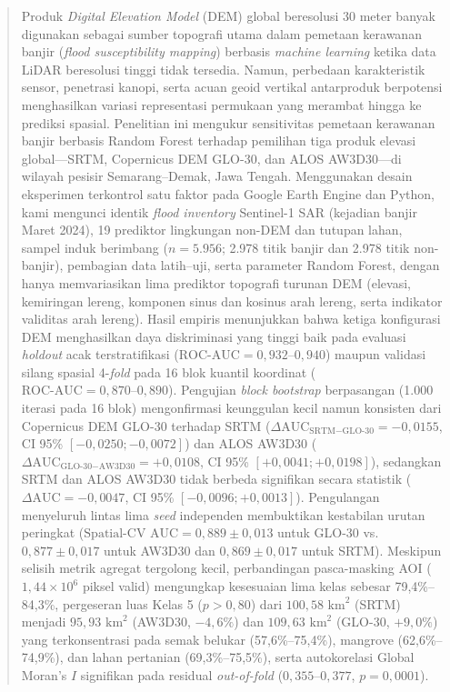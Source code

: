 \documentclass[11pt,twoside]{article}
\author{
\begin{minipage}{\textwidth}
\authorone,
\authortwo
\\[1em]
$^1$ \affilone\\
\corrauthor
\end{minipage}
}
\date{\vspace{-1.5em}}
\begin{document}
\maketitle

\begin{abstract}
Produk \textit{Digital Elevation Model} (DEM) global beresolusi 30 meter banyak digunakan sebagai sumber topografi utama dalam pemetaan kerawanan banjir (\textit{flood susceptibility mapping}) berbasis \textit{machine learning} ketika data LiDAR beresolusi tinggi tidak tersedia. Namun, perbedaan karakteristik sensor, penetrasi kanopi, serta acuan geoid vertikal antarproduk berpotensi menghasilkan variasi representasi permukaan yang merambat hingga ke prediksi spasial. Penelitian ini mengukur sensitivitas pemetaan kerawanan banjir berbasis Random Forest terhadap pemilihan tiga produk elevasi global---SRTM, Copernicus DEM GLO-30, dan ALOS AW3D30---di wilayah pesisir Semarang--Demak, Jawa Tengah. Menggunakan desain eksperimen terkontrol satu faktor pada Google Earth Engine dan Python, kami mengunci identik \textit{flood inventory} Sentinel-1 SAR (kejadian banjir Maret 2024), 19 prediktor lingkungan non-DEM dan tutupan lahan, sampel induk berimbang ($n = 5.956$; 2.978 titik banjir dan 2.978 titik non-banjir), pembagian data latih--uji, serta parameter Random Forest, dengan hanya memvariasikan lima prediktor topografi turunan DEM (elevasi, kemiringan lereng, komponen sinus dan kosinus arah lereng, serta indikator validitas arah lereng). Hasil empiris menunjukkan bahwa ketiga konfigurasi DEM menghasilkan daya diskriminasi yang tinggi baik pada evaluasi \textit{holdout} acak terstratifikasi ($\text{ROC-AUC} = 0{,}932\text{--}0{,}940$) maupun validasi silang spasial 4-\textit{fold} pada 16 blok kuantil koordinat ($\text{ROC-AUC} = 0{,}870\text{--}0{,}890$). Pengujian \textit{block bootstrap} berpasangan (1.000 iterasi pada 16 blok) mengonfirmasi keunggulan kecil namun konsisten dari Copernicus DEM GLO-30 terhadap SRTM ($\Delta\text{AUC}_{\text{SRTM}-\text{GLO-30}} = -0{,}0155$, CI 95\% $[-0{,}0250; -0{,}0072]$) dan ALOS AW3D30 ($\Delta\text{AUC}_{\text{GLO-30}-\text{AW3D30}} = +0{,}0108$, CI 95\% $[+0{,}0041; +0{,}0198]$), sedangkan SRTM dan ALOS AW3D30 tidak berbeda signifikan secara statistik ($\Delta\text{AUC} = -0{,}0047$, CI 95\% $[-0{,}0096; +0{,}0013]$). Pengulangan menyeluruh lintas lima \textit{seed} independen membuktikan kestabilan urutan peringkat ($\text{Spatial-CV AUC} = 0{,}889 \pm 0{,}013$ untuk GLO-30 vs.\ $0{,}877 \pm 0{,}017$ untuk AW3D30 dan $0{,}869 \pm 0{,}017$ untuk SRTM). Meskipun selisih metrik agregat tergolong kecil, perbandingan pasca-masking AOI ($1{,}44 \times 10^6$ piksel valid) mengungkap kesesuaian lima kelas sebesar 79,4\%--84,3\%, pergeseran luas Kelas 5 ($p > 0{,}80$) dari $100{,}58\text{ km}^2$ (SRTM) menjadi $95{,}93\text{ km}^2$ (AW3D30, $-4{,}6\%$) dan $109{,}63\text{ km}^2$ (GLO-30, $+9{,}0\%$) yang terkonsentrasi pada semak belukar (57,6\%--75,4\%), mangrove (62,6\%--74,9\%), dan lahan pertanian (69,3\%--75,5\%), serta autokorelasi Global Moran's $I$ signifikan pada residual \textit{out-of-fold} ($0{,}355\text{--}0{,}377$, $p = 0{,}0001$).
\end{abstract}
\end{document}
